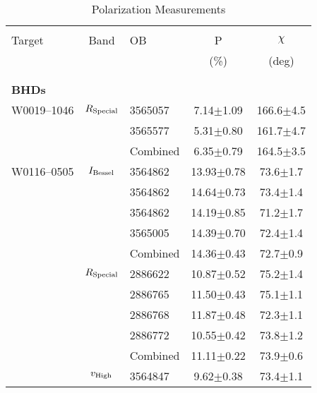 \begin{table}
    \caption{\label{tab:pols} Polarization Measurements}
    \begin{tabular}{lclcc}
        \hline \hline\\
        Target & Band & OB &  P   & $\chi$ \\
               &      &    & (\%) &  (deg) \\
        \\
        \hline\\
        {\bf{BHDs}}\\
        W0019--1046  & $R_{\rm Special}$ & 3565057   & \phantom{0}7.14$\pm$1.09 &           166.6$\pm$4.5 \\
                     &                   & 3565577   & \phantom{0}5.31$\pm$0.80 &           161.7$\pm$4.7 \\
                     &                   & Combined  & \phantom{0}6.35$\pm$0.79 &           164.5$\pm$3.5 \\
        W0116--0505  & $I_{\rm Bessel}$  & 3564862   &           13.93$\pm$0.78 & \phantom{0}73.6$\pm$1.7 \\
                     &                   & 3564862   &           14.64$\pm$0.73 & \phantom{0}73.4$\pm$1.4 \\
                     &                   & 3564862   &           14.19$\pm$0.85 & \phantom{0}71.2$\pm$1.7 \\
                     &                   & 3565005   &           14.39$\pm$0.70 & \phantom{0}72.4$\pm$1.4 \\
                     &                   & Combined  &           14.36$\pm$0.43 & \phantom{0}72.7$\pm$0.9 \\
                     & $R_{\rm Special}$ & 2886622   &           10.87$\pm$0.52 & \phantom{0}75.2$\pm$1.4 \\
                     &                   & 2886765   &           11.50$\pm$0.43 & \phantom{0}75.1$\pm$1.1 \\
                     &                   & 2886768   &           11.87$\pm$0.48 & \phantom{0}72.3$\pm$1.1 \\
                     &                   & 2886772   &           10.55$\pm$0.42 & \phantom{0}73.8$\pm$1.2 \\
                     &                   & Combined  &           11.11$\pm$0.22 & \phantom{0}73.9$\pm$0.6 \\
                     & $v_{\rm High}$    & 3564847   & \phantom{0}9.62$\pm$0.38 & \phantom{0}73.4$\pm$1.1 \\

\end{tabular}
\end{table}
